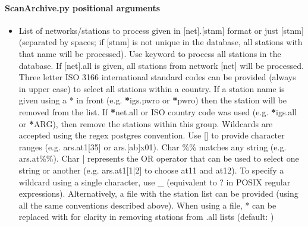 \documentclass[letterpaper,10pt,english]{sphinxmanual}
\begin{document}
\paragraph{ScanArchive.py positional arguments}
\label{\detokenize{com:ScanArchive.py-positional-arguments}}\begin{itemize}
\item {} 
\sphinxAtStartPar
{\hyperref[\detokenize{com:ScanArchive.py-all|net.stnm}]{}} \sphinxhyphen{} List of networks/stations to process given in {[}net{]}.{[}stnm{]} format or just {[}stnm{]} (separated by spaces; if {[}stnm{]} is not unique in the database, all stations with that name will be processed). Use keyword  to process all stations in the database. If {[}net{]}.all is given, all stations from network {[}net{]} will be processed. Three letter ISO 3166 international standard codes can be provided (always in upper case) to select all stations within a country. If a station name is given using a * in front (e.g. {\color{red}\bfseries{}*}igs.pwro or {\color{red}\bfseries{}*}pwro) then the station will be removed from the list. If {\color{red}\bfseries{}*}net.all or ISO country code was used (e.g. {\color{red}\bfseries{}*}igs.all or {\color{red}\bfseries{}*}ARG), then remove the stations within this group. Wildcards are accepted using the regex postgres convention. Use {[}{]} to provide character ranges (e.g. ars.at1{[}3\sphinxhyphen{}5{]} or ars.{[}a\sphinxhyphen{}b{]}x01). Char \%\% matches any string (e.g. ars.at\%\%). Char | represents the OR operator that can be used to select one string or another (e.g. ars.at1{[}1|2{]} to choose at11 and at12). To specify a wildcard using a single character, use \_ (equivalent to ? in POSIX regular expressions). Alternatively, a file with the station list can be provided (using all the same conventions described above). When using a file, * can be replaced with \sphinxhyphen{} for clarity in removing stations from .all lists (default: )

\end{itemize}
\end{document}
